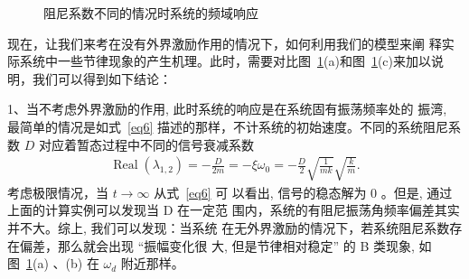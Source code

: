\documentclass[withoutpreface,bwprint]{cumcmthesis} %
\begin{document}
\begin{figure}[h!t]
    \caption{阻尼系数不同的情况时系统的频域响应}
    \label{fig2}
    \end{figure}

现在，让我们来考在没有外界激励作用的情况下，如何利用我们的模型来阐
释实际系统中一些节律现象的产生机理。此时，需要对比图~\ref{fig2}(a)和图~\ref{fig2}(c)来加以说明，我们可以得到如下结论：

1、当不考虑外界激励的作用, 此时系统的响应是在系统固有振荡频率处的 振湾, 最简单的情况是如式~\eqref{eq6} 描述的那样，不计系统的初始速度。不同的系统阻尼系数 $ D $ 对应着暂态过程中不同的信号衰减系数
\begin{align*}
\operatorname{Real}\left(\lambda_{1,2}\right)=-\frac{D}{2 m}=-\xi \omega_{0}=-\frac{D}{2} \sqrt{\frac{1}{m k}} \sqrt{\frac{k}{m}}.
\end{align*}
考虑极限情况，当 $ t \rightarrow \infty $ 从式~\eqref{eq6} 可
以看出, 信号的稳态解为 0 。但是, 通过上面的计算实例可以发现当  D  在一定范 围内，系统的有阻尼振荡角频率偏差其实并不大。综上, 我们可以发现：当系统 在无外界激励的情况下，若系统阻尼系数存在偏差，那么就会出现 “振幅变化很 大, 但是节律相对稳定” 的  B 类现象, 如图~\ref{fig2}(a) 、(b)  在  $\omega_{d}$  附近那样。
\end{document}
